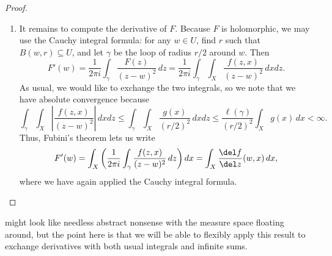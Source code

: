 \documentclass[notes.tex]{subfiles}
\begin{document}
\begin{proof}
\begin{enumerate}
		\item It remains to compute the derivative of $F$. Because $F$ is holomorphic, we may use the Cauchy integral formula: for any $w\in U$, find $r$ such that $B(w,r)\subseteq U$, and let $\gamma$ be the loop of radius $r/2$ around $w$. Then
		\[F'(w)=\frac1{2\pi i}\int_\gamma\frac{F(z)}{(z-w)^2}\,dz=\frac1{2\pi i}\int_\gamma\int_X\frac{f(z,x)}{(z-w)^2}\,dxdz.\]
		As usual, we would like to exchange the two integrals, so we note that we have absolute convergence because
		\[\int_\gamma\int_X\left|\frac{f(z,x)}{(z-w)^2}\right|\,dxdz\le\int_\gamma\int_X\frac{g(x)}{(r/2)^2}\,dxdz\le\frac{\ell(\gamma)}{(r/2)^2}\int_Xg(x)\,dx<\infty.\]
		Thus, Fubini's theorem lets us write
		\[F'(w)=\int_X\left(\frac1{2\pi i}\int_\gamma\frac{f(z,x)}{(z-w)^2}\,dz\right)dx=\int_X\frac{\del f}{\del z}(w,x)\,dx,\]
		where we have again applied the Cauchy integral formula.
		\qedhere
	\end{enumerate}
\end{proof}
\begin{remark}
	 might look like needless abstract nonsense with the measure space floating around, but the point here is that we will be able to flexibly apply this result to exchange derivatives with both usual integrals and infinite sums.
\end{remark}
\end{document}
